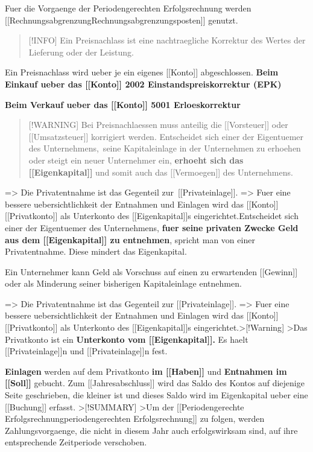 Fuer die Vorgaenge der Periodengerechten Erfolgsrechnung werden
{[}{[}Rechnungsabgrenzung\textbar Rechnungsabgrenzungsposten{]}{]}
genutzt.

\begin{quote}
{[}!INFO{]} Ein Preisnachlass ist eine nachtraegliche Korrektur des
Wertes der Lieferung oder der Leistung.
\end{quote}

Ein Preisnachlass wird ueber je ein eigenes {[}{[}Konto{]}{]}
abgeschlossen. \textbf{Beim Einkauf ueber das {[}{[}Konto{]}{]} 2002
Einstandspreiskorrektur (EPK)}

\textbf{Beim Verkauf ueber das {[}{[}Konto{]}{]} 5001 Erloeskorrektur}

\begin{quote}
{[}!WARNING{]} Bei Preisnachlaessen muss anteilig die
{[}{[}Vorsteuer{]}{]} oder {[}{[}Umsatzsteuer{]}{]} korrigiert werden.
Entscheidet sich einer der Eigentuemer des Unternehmens,~seine
Kapitaleinlage in der Unternehmen zu erhoehen oder steigt ein neuer
Unternehmer ein, \textbf{erhoeht sich das {[}{[}Eigenkapital{]}{]}} und
somit auch das {[}{[}Vermoegen{]}{]} des Unternehmens.
\end{quote}

=\textgreater{} Die Privatentnahme ist das Gegenteil
zur~{[}{[}Privateinlage{]}{]}. =\textgreater{} Fuer eine bessere
uebersichtlichkeit der Entnahmen und Einlagen wird das {[}{[}Konto{]}{]}
{[}{[}Privatkonto{]}{]} als Unterkonto des {[}{[}Eigenkapital{]}{]}s
eingerichtet.Entscheidet sich einer der Eigentuemer des Unternehmens,
\textbf{fuer seine privaten Zwecke Geld aus dem {[}{[}Eigenkapital{]}{]}
zu entnehmen}, spricht man von einer Privatentnahme. Diese mindert das
Eigenkapital.

Ein Unternehmer kann Geld als Vorschuss auf einen zu erwartenden
{[}{[}Gewinn{]}{]} oder als Minderung seiner bisherigen Kapitaleinlage
entnehmen.

=\textgreater{} Die Privatentnahme ist das Gegenteil zur
{[}{[}Privateinlage{]}{]}. =\textgreater{} Fuer eine bessere
uebersichtlichkeit der Entnahmen und Einlagen wird das {[}{[}Konto{]}{]}
{[}{[}Privatkonto{]}{]} als Unterkonto des {[}{[}Eigenkapital{]}{]}s
eingerichtet.\textgreater{[}!Warning{]} \textgreater Das Privatkonto ist
ein \textbf{Unterkonto vom {[}{[}Eigenkapital{]}{]}.} Es haelt
{[}{[}Privateinlage{]}{]}n und {[}{[}Privateinlage{]}{]}n fest.

\textbf{Einlagen} werden auf dem Privatkonto \textbf{im
{[}{[}Haben{]}{]}} und \textbf{Entnahmen im {[}{[}Soll{]}{]}} gebucht.
Zum {[}{[}Jahresabschluss{]}{]} wird das Saldo des Kontos auf diejenige
Seite geschrieben, die kleiner ist und dieses Saldo wird im Eigenkapital
ueber eine {[}{[}Buchung{]}{]} erfasst. \textgreater{[}!SUMMARY{]}
\textgreater Um der {[}{[}Periodengerechte
Erfolgsrechnung\textbar periodengerechten Erfolgsrechnung{]}{]} zu
folgen, werden Zahlungsvorgaenge, die nicht in diesem Jahr auch
erfolgswirksam sind, auf ihre entsprechende Zeitperiode verschoben.

